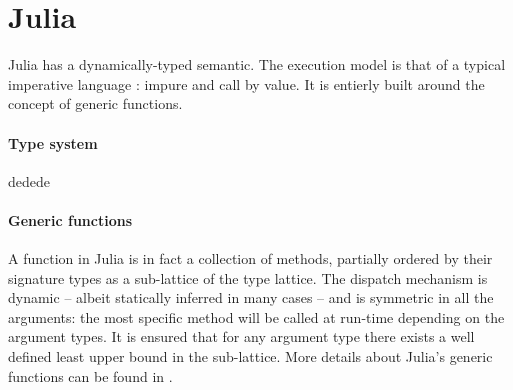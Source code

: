 \documentclass[11pt]{article}
\begin{document}
\begin{comment}
\paragraph{Product domains} Having a generic language also opens the opportunity for generic constructs, such as the reduced product. Given two abstract domains $D_1$ and $D_2$, we want to build a combination of those that carries at least as much information. The first natural choice could be the Cartesian product; however, there is no advantage in computing in $D_1\times D_2$ compared to running two separate analysis. We can instead, given two reduction maps $r_1:D_1\times D_2\to D_1$ and $r_2:D_2\times D_1\to D_2$, form the so-called reduced product $D_1 \otimes D_2$ under some soundness conditions. [note: same as fibered product in the category associated to the order] Elements $s_1\otimes s_2$ of $D_1 \otimes D_2$ satisfy the property that $r_1(s_1,s_2) = s_1$ and $r_2(s_2,s_1) = s_2$. Intuitively, $r_1$ and $r_2$ provide cross domain intersection -- or meet. That is, they must satisfy \todo{all of the following criteria?}
\begin{align*}
r_1(s_1,s_2) \leq s_1~\text{and}~ \gamma_1(r_1(s_1,s_2)) \leq \gamma_2(s_2) \\
r_2(s_2,s_1) \leq s_2~\text{and}~ \gamma_2(r_2(s_2,s_1)) \leq \gamma_1(s_1)
\end{align*}
The reduced product formalizes the sharing of information between separate abstract domains, and is central to the modularity of our implementation.

As with all elegant formalisms, abstract interpretation provides a good way to structure one's thoughts. Here, about families of static analysis. \todo{fragment} By extension, it also points towards a good way to structure the analyzer itself in a composable way.
\end{comment}
\section*{Julia}
Julia has a dynamically-typed semantic. The execution model is that of a typical imperative language : impure and call by value. It is entierly built around the concept of generic functions.
\paragraph{Type system} dedede

\paragraph{Generic functions} A function in Julia is in fact a collection of methods, partially ordered by their signature types as a sub-lattice of the type lattice\cite{julia-paper}.
The dispatch mechanism is dynamic -- albeit statically inferred in many cases -- and is symmetric in all the arguments: the most specific method will be called at run-time depending on the argument types.
It is ensured that for any argument type there exists a well defined least upper bound in the sub-lattice.
More details about Julia's generic functions can be found in \cite{julia-paper,jeff-phd}.
\end{document}
